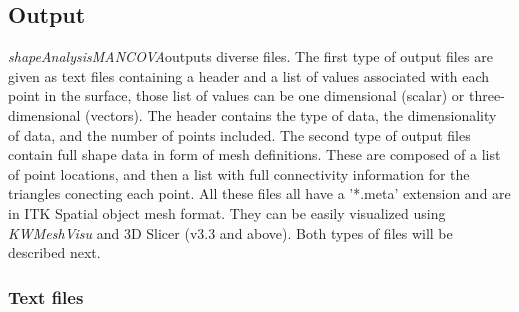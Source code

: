 \documentclass{InsightArticle}
\newcommand{\ProgramName}{\textit{shapeAnalysisMANCOVA}}
\begin{document}
\subsection{Output}
\label{sec:outputs}

\ProgramName outputs diverse files. The first type of output files are given as text files containing a header and a list of values associated with each point in the surface, those list of values can be one dimensional (scalar) or three-dimensional (vectors). The header contains the type of data, the dimensionality of data, and the number of points included. The second type of output files contain full shape data in form of mesh definitions. These are composed of a list of point locations, and then a list with full connectivity information for the triangles conecting each point. All these files all have a '*.meta' extension and are in ITK Spatial object mesh format. They can be easily visualized using \emph{KWMeshVisu} \cite{Oguz06} and 3D Slicer (v3.3 and above). Both types of files will be described next.

\subsubsection{Text files}
\label{sec:tfiles} 
\end{document}
